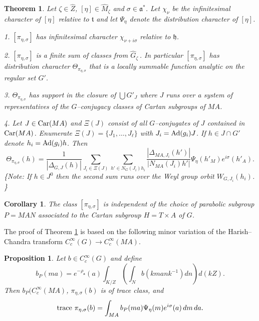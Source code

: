 \documentclass{conm-p-l}
\newtheorem{theorem}[equation]{Theorem}
\newtheorem{corollary}[equation]{Corollary}
\newtheorem{proposition}[equation]{Proposition}
\def\ga{\mathfrak{a}}
\def\gh{\mathfrak{h}}
\def\gt{\mathfrak{t}}
\def\Ad{{\rm Ad}}
\def\Car{{\rm Car}}
\begin{document}
\begin{theorem}\label{4.3.8}
Let $\zeta \in \widehat{Z}$, $[\eta] \in \widehat{M}_\zeta$ and $\sigma \in
\ga^*$.  Let $\chi_\nu$ be the infinitesimal character of $[\eta]$
relative to $\gt$ and let $\Psi_\eta$ denote the distribution character
of $[\eta]$.

{\rm 1.} $[\pi_{\eta,\sigma}]$ has infinitesimal character 
$\chi_{\nu +i\sigma}$ relative to $\gh$.

{\rm 2.} $[\pi_{\eta,\sigma}]$ is a finite sum of classes from 
$\widehat{G}_\zeta$\,.  In particular $[\pi_{\eta,\sigma}]$ has distribution
character $\Theta_{\pi_{\eta,\sigma}}$ that is a locally summable function
analytic on the regular set $G'$.

{\rm 3.} $\Theta_{\pi_{\eta,\sigma}}$ has support in the closure of
${\bigcup} G'_J$ where $J$ runs over a system of representatives of the
$G$--conjugacy classes of Cartan subgroups of $MA$.

{\rm 4.} Let $J \in \Car(MA)$ and $\Xi(J)$ consist of all $G$--conjugates
of $J$ contained in $\Car(MA)$.  Enumerate 
$\Xi(J) = \{J_1,\dots, J_\ell\}$ with $J_i = \Ad(g_i)J$.
If $h \in J\cap G'$ denote $h_i = \Ad(g_i)h$.  Then
$$
\Theta_{\pi_{\eta,\sigma}}(h) = \frac{1}{|\Delta_{G,J}(h)|}
\sum_{J_i \in \Xi(J)}\sum_{h' \in N_G(J_i)h_i}
\frac{|\Delta_{MA,J_i}(h')|}{|N_{MA}(J_i)h'|}
\Psi_\eta(h'_M) e^{i\sigma}(h'_A).
$$
\{Note: If $h \in J^0$ then the second sum runs over the Weyl group orbit 
$W_{G,J_i}(h_i)$.  \}
\end{theorem}
\begin{corollary}\label{4.3.9}
The class $[\pi_{\eta,\sigma}]$ is independent of the choice of parabolic
subgroup $P=MAN$ associated to the Cartan subgroup $H=T\times A$ of $G$.
\end{corollary}

The proof of Theorem \ref{4.3.8} is based on the following 
minor variation of the Harish--Chandra transform
$C^\infty_c(G) \to C^\infty_c(MA)$.

\begin{proposition}\label{4.3.10}
Let $b \in C^\infty_c(G)$ and define 
\begin{equation}\label{4.3.11a}
b_P(ma) = 
e^{-\rho_\ga}(a)\int_{K/Z}\left ( \int_N b(kmank^{-1})dn\right )d(kZ).
\end{equation}
Then $b_P(C^\infty_c(MA)$, $\pi_{\eta,\sigma}(b)$ is of trace class, and
\begin{equation}\label{4.3.11b}
{\rm \text{trace\,\,}} \pi_{\eta,\sigma}(b) = 
	\int_{MA} b_P(ma)\Psi_\eta(m)e^{i\sigma}(a)\, dm\, da.
\end{equation}
\end{proposition}
\end{document}
